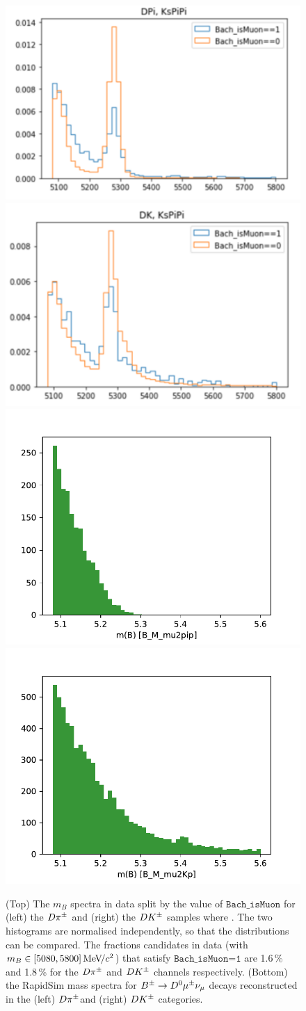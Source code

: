 \begin{figure}[tb]
    \centering
    \includegraphics[width=0.4\columnwidth]{figures/analysis/semileptonic_bkgs/muon_check_dpi.pdf}
    \includegraphics[width=0.4\columnwidth]{figures/analysis/semileptonic_bkgs/muon_check_dk.pdf}
    \includegraphics[width=0.4\columnwidth]{figures/analysis/semileptonic_bkgs/B2Dmunu_Dpi_rapidsim.pdf}
    \includegraphics[width=0.4\columnwidth]{figures/analysis/semileptonic_bkgs/B2Dmunu_DK_rapidsim.pdf}
    \caption{(Top) The $m_B$ spectra in data split by the value of $\texttt{Bach\_isMuon}$ for (left) the $D\pi^\pm$ and (right) the ${{D}{{K}^\pm}}$ samples where \DtoKspipi. The two histograms are normalised independently, so that the distributions can be compared. The fractions candidates in data (with $m_B\in[5080, 5800]\text{\,Me\kern -0.1em V\!/}c^2$) that satisfy $\texttt{Bach\_isMuon=1}$ are 1.6\,\% and 1.8\,\% for the $D\pi^\pm$ and ${{D}{{K}^\pm}}$ channels respectively. (Bottom) the RapidSim mass spectra for ${{B}^\pm}\rightarrow{\ensuremath{{D}^0}}{\ensuremath{\mu^\pm}}\nu_\mu$ decays reconstructed in the (left) $D\pi^\pm $and (right) ${{D}{{K}^\pm}}$ categories.}
    \label{fig:semileptonic_B_check_mu}
\end{figure}

